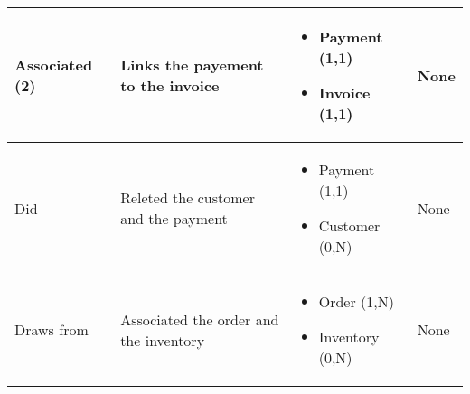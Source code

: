 \begin{longtable}{|p{}|p{} |p{}|p{} |}
Associated (2) & Links the payement to the invoice & \begin{itemize}
	\vspace{-1em}
	\item Payment (1,1)
	\item Invoice  (1,1)
\end{itemize}
&  None \\\hline

Did & Releted the customer and the payment & \begin{itemize}
	\vspace{-1em}
	\item Payment (1,1)
	\item Customer  (0,N)
\end{itemize}
&  None \\\hline

Draws from & Associated the order and the inventory & \begin{itemize}
	\vspace{-1em}
	\item Order (1,N)
	\item Inventory  (0,N)
\end{itemize}
&  None \\\hline


\end{longtable}